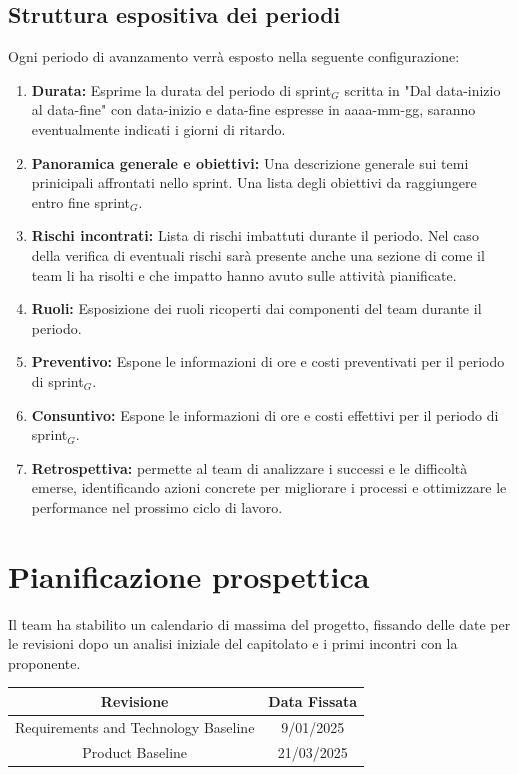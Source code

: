 \documentclass[10pt]{article}
\begin{document}
{\subsection{Struttura espositiva dei periodi} \label{struttura-espositiva}
Ogni periodo di avanzamento verrà esposto nella seguente configurazione:
\begin{enumerate}
 \item \textbf{Durata:} Esprime la durata del periodo di sprint$_G$ scritta in "Dal data-inizio al data-fine" con data-inizio e data-fine espresse in aaaa-mm-gg, saranno eventualmente indicati i giorni di ritardo.
 \item \textbf{Panoramica generale e obiettivi:} Una descrizione generale sui temi prinicipali affrontati nello sprint. Una lista degli obiettivi da raggiungere entro fine sprint$_G$.
 \item \textbf{Rischi incontrati:} Lista di rischi imbattuti durante il periodo. Nel caso  della verifica di eventuali rischi sarà presente anche una sezione di come il team li ha risolti e che impatto hanno avuto sulle attività pianificate. 
 \item \textbf{Ruoli:} Esposizione dei ruoli ricoperti dai componenti del team durante il periodo.
 \item \textbf{Preventivo:} Espone le informazioni di ore e costi preventivati per il periodo di sprint$_G$.
 \item \textbf{Consuntivo:} Espone le informazioni di ore e costi effettivi per il periodo di sprint$_G$.
 \item \textbf{Retrospettiva:} permette al team di analizzare i successi e le difficoltà emerse, identificando azioni concrete per migliorare i processi e ottimizzare le performance nel prossimo ciclo di lavoro.
\end{enumerate}
\newpage
\clearpage
{}
\section{Pianificazione prospettica}

Il team ha stabilito un calendario di massima del progetto, fissando delle date per le revisioni dopo un analisi iniziale del capitolato e i primi incontri con la proponente.

\begin{table}[H]
    \centering
    \begin{tabular}{|c|c|}
    \hline
    \rowcolor{gray!25}
    \textbf{Revisione} & \textbf{Data Fissata} \\
    \hline
     Requirements and Technology Baseline & 9/01/2025 \\
     \hline
     Product Baseline & 21/03/2025 \\
     \hline
     

\end{tabular}
\end{table}}
\end{document}
